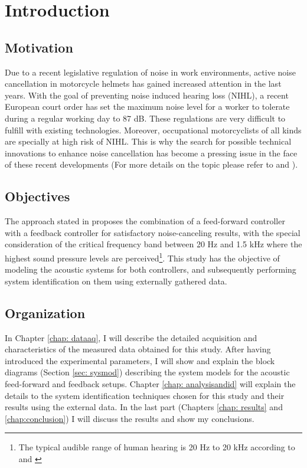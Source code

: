 


\chapter{Introduction}

\section{Motivation}
Due to a recent legislative regulation of noise in work environments, active noise cancellation in motorcycle helmets has gained increased attention in the last years. With the goal of preventing noise induced hearing loss (NIHL), a recent European court order has set the maximum noise level for a worker to tolerate during a regular working day to 87 dB. These regulations are very difficult to fulfill with existing technologies. Moreover, occupational motorcyclists of all kinds are specially at high risk of NIHL. This is why the search for possible technical innovations to enhance noise cancellation has become a pressing issue in the face of these recent developments (For more details on the topic please refer to \cite{castae2010active} and \cite{violini2014}). 

\section{Objectives}

The approach stated in \cite{castae2010active} proposes the combination of a feed-forward controller with a feedback controller for satisfactory noise-canceling results, with the special consideration of the critical frequency band between 20 Hz and 1.5 kHz where the highest sound pressure levels are perceived\footnote[1]{The typical audible range of human hearing is 20 Hz to 20 kHz according to \cite{castae2010active} and \cite{esnaola2005mirela}}. This study has the objective of modeling the acoustic systems for both controllers, and subsequently performing system identification on them using externally gathered data.

\section{Organization}

In Chapter \ref{chap: dataaq}, I will describe the detailed acquisition and characteristics of the measured data obtained for this study. After having introduced the experimental parameters, I will show and explain the block diagrams (Section \ref{sec: sysmod}) describing the system models for the acoustic feed-forward and feedback setups. Chapter \ref{chap: analysisandid} will explain the details to the system identification techniques chosen for this study and their results using the external data. In the last part (Chapters \ref{chap: results} and \ref{chap:conclusion}) I will discuss the results and show my conclusions.


